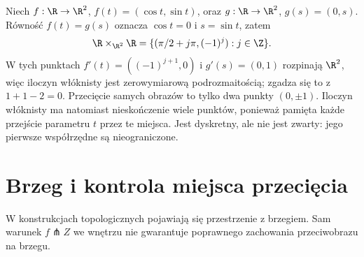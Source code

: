 \begin{przyklad}
\label{prz:iloczyn-wloknisty-okrag-19}
Niech $f:\R\to\R^2$, $f(t)=(\cos t,\sin t)$, oraz
$g:\R\to\R^2$, $g(s)=(0,s)$.
Równość $f(t)=g(s)$ oznacza $\cos t=0$ i $s=\sin t$,
zatem
\[
 \R\times_{\R^2}\R
 =\{(\pi/2+j\pi,(-1)^j):j\in\Z\}.
\]
W tych punktach $f'(t)=((-1)^{j+1},0)$ i $g'(s)=(0,1)$
rozpinają $\R^2$, więc iloczyn włóknisty jest
zerowymiarową podrozmaitością; zgadza się to z $1+1-2=0$.
Przecięcie samych obrazów to tylko dwa punkty $(0,\pm1)$.
Iloczyn włóknisty ma natomiast nieskończenie wiele punktów,
ponieważ pamięta każde przejście parametru $t$ przez te miejsca.
Jest dyskretny, ale nie jest zwarty:
jego pierwsze współrzędne są nieograniczone.
\end{przyklad}

\section{Brzeg i kontrola miejsca przecięcia}
\label{sec:transwersalnosc-brzeg}

W konstrukcjach topologicznych pojawiają się
przestrzenie z brzegiem. Sam warunek
$f\pitchfork Z$ we wnętrzu nie gwarantuje
poprawnego zachowania przeciwobrazu na brzegu.

